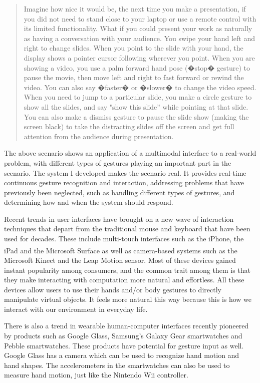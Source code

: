 \begin{quotation}
Imagine how nice it would be, the next time you make a presentation, if you did not need to stand close to your laptop or use a remote control with its limited functionality. What if you could present your work as naturally as having a conversation with your audience. You swipe your hand left and right to change slides. When you point to the slide with your hand, the display shows a pointer cursor following wherever you point. When you are showing a video, you use a palm forward hand pose (�stop� gesture) to pause the movie, then move left and right to fast forward or rewind the video. You can also say �faster� or �slower� to change the video speed. When you need to jump to a particular slide, you make a circle gesture to show all the slides, and say "show this slide'' while pointing at that slide. You can also make a dismiss gesture to pause the slide show (making the screen black) to take the distracting slides off the screen and get full attention from the audience during presentation.

\end{quotation}

The above scenario shows an application of a multimodal interface to a
real-world problem, with different types of gestures playing an important part
in the scenario. The system I developed makes the scenario real. It provides real-time continuous gesture recognition and interaction, addressing problems that have previously been neglected, such as handling different types of gestures, and determining how and when the system should respond. 

 
Recent trends in user interfaces have brought on a new wave of interaction
techniques that depart from the traditional mouse and keyboard that have been 
used for decades. These include multi-touch interfaces such as the 
iPhone, the iPad and the Microsoft 
Surface\textsuperscript{\textregistered} as well as camera-based systems such as
the Microsoft Kinect and the Leap Motion sensor. Most
of these devices gained instant popularity among consumers, and the common trait
among them is that they make interacting with computation more natural and 
effortless. All these devices allow users to use their hands and/or body 
gestures to directly manipulate virtual objects. It feels more natural this 
way because this is how we interact with our environment in everyday life.
 
There is also a trend in wearable human-computer interfaces recently pioneered
by products such as Google Glass, Samsung's Galaxy Gear smartwatches and Pebble
smartwatches. These products have potential for gesture input as well. Google
Glass has a camera which can be used to recognize hand motion and hand shapes.
The accelerometers in the smartwatches can also be used to measure hand motion,
just like the Nintendo Wii controller.

